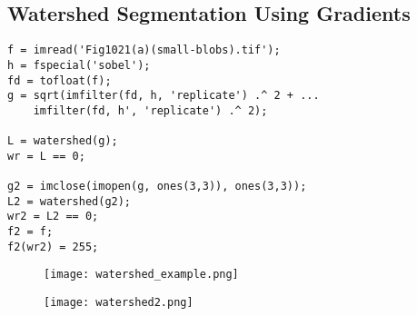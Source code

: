 \subsection{Watershed Segmentation Using Gradients}

\begin{frame}[fragile]
\begin{lstlisting}
f = imread('Fig1021(a)(small-blobs).tif');
h = fspecial('sobel');
fd = tofloat(f);
g = sqrt(imfilter(fd, h, 'replicate') .^ 2 + ...
    imfilter(fd, h', 'replicate') .^ 2);

L = watershed(g);
wr = L == 0;

g2 = imclose(imopen(g, ones(3,3)), ones(3,3));
L2 = watershed(g2);
wr2 = L2 == 0;
f2 = f;
f2(wr2) = 255;
\end{lstlisting}
\end{frame}

\begin{frame}
\begin{figure}[!h]
\centering
\texttt{[image: watershed\_example.png]}
\end{figure}
\end{frame}

\begin{frame}
\begin{figure}[!h]
\centering
\texttt{[image: watershed2.png]}
\end{figure}
\end{frame}

%





